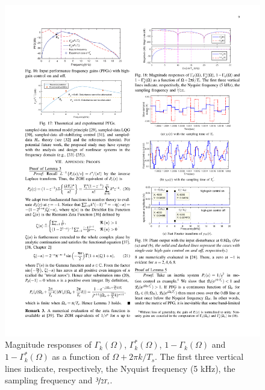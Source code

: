 \documentclass [11pt, proquest] {uwthesis}[2020/02/24]
\begin{document}
\begin{figure}[!ht]
\begin{centering}
\includegraphics[width=13cm]{Spectral-analysis/FIG18.pdf}
\par\end{centering}
\caption{\label{fig:Magnitude-responses-of-10}Magnitude responses of $\Gamma_{k}(\Omega)$,
$\Gamma_{k}^{*}(\Omega)$, $1-\Gamma_{k}(\Omega)$ and $1-\Gamma_{k}^{*}(\Omega)$
as a function of $\Omega+2\pi k/T_{s}$. The first three vertical
lines indicate, respectively, the Nyquist frequency (5 kHz), the sampling
frequency and $\nicefrac{3}{2T_{s}}$.}
\end{figure}
\end{document}
